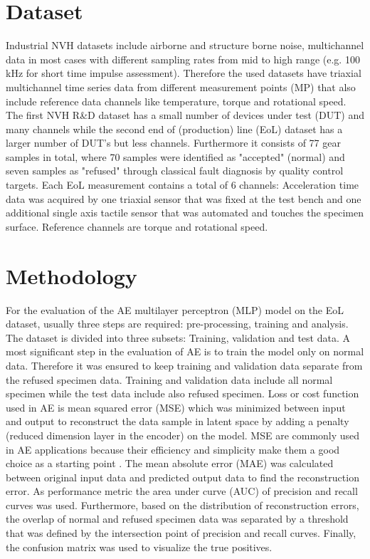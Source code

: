 \documentclass[a4paper, 10pt, twocolumn]{article}
\begin{document}
\section*{Dataset}
\label{sec:Dataset}
Industrial NVH datasets include airborne and structure borne noise, multichannel data in most cases with different sampling rates from mid to high range (e.g. 100 kHz for short time impulse assessment). Therefore the used datasets have triaxial multichannel time series data from different measurement points (MP) that also include reference data channels like temperature, torque and rotational speed. The first NVH R\&D dataset has a small number of devices under test (DUT) and many channels while the second end of (production) line (EoL) dataset has a larger number of DUT’s but less channels.  Furthermore it consists of 77 gear samples in total, where 70 samples were identified as "accepted" (normal) and seven samples as "refused" through classical fault diagnosis by quality control targets. Each EoL measurement contains a total of 6 channels: Acceleration time data was acquired by one triaxial sensor that was fixed at the test bench and one additional single axis tactile sensor that was automated and touches the specimen surface. Reference channels are torque and rotational speed.  

\section*{Methodology}
\label{sec:Methodology}
For the evaluation of the AE multilayer perceptron (MLP) model on the EoL dataset, usually three steps are required: pre-processing, training and analysis. The dataset is divided into three subsets: Training,  validation and test data. A most significant step in the evaluation of AE is to train the model only on normal data. Therefore it was ensured to keep training and validation data separate from the refused specimen data. Training and validation data include all normal specimen while the test data include also refused specimen. Loss or cost function used in AE is mean squared error (MSE) which was minimized between input and output to reconstruct the data sample in latent space by adding a penalty (reduced dimension layer in the encoder) on the model. MSE are commonly used in AE applications because their efficiency and simplicity make them a good choice as a starting point \cite{b5}. The mean absolute error (MAE) was calculated between original input data and predicted output data to find the reconstruction error. As performance metric the area under curve (AUC) of precision and recall curves was used. Furthermore, based on the distribution of reconstruction errors, the overlap of normal and refused specimen data was separated by a threshold that was defined by the intersection point of precision and recall curves. Finally, the confusion matrix was used to visualize the true positives.
\end{document}
